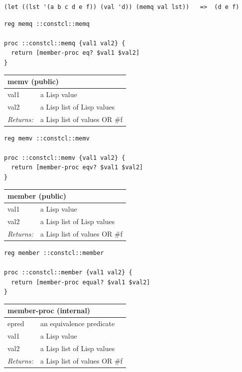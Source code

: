 \documentclass[twoside,9pt]{report}
\begin{document}
\noindent\makebox[\linewidth]{\rule{\linewidth}{0.4pt}}
\begin{lstlisting}
(let ((lst '(a b c d e f)) (val 'd)) (memq val lst))   =>  (d e f)
\end{lstlisting}
\noindent\makebox[\linewidth]{\rule{\linewidth}{0.4pt}}
\noindent\makebox[\linewidth]{\rule{\linewidth}{0.4pt}}
\begin{lstlisting}
reg memq ::constcl::memq
 
proc ::constcl::memq {val1 val2} {
  return [member-proc eq? $val1 $val2]
}
\end{lstlisting}
\noindent\makebox[\linewidth]{\rule{\linewidth}{0.4pt}}
\begin{tabular}{ |l l| }
\hline
\multicolumn{2}{|l|}{memv (public)} \\
\hline
val1 & a Lisp value \\
val2 & a Lisp list of Lisp values \\
\textit{Returns:} & a Lisp list of values OR \#f \\
\hline
\end{tabular}

\noindent\makebox[\linewidth]{\rule{\linewidth}{0.4pt}}
\begin{lstlisting}
reg memv ::constcl::memv
 
proc ::constcl::memv {val1 val2} {
  return [member-proc eqv? $val1 $val2]
}
\end{lstlisting}
\noindent\makebox[\linewidth]{\rule{\linewidth}{0.4pt}}
\begin{tabular}{ |l l| }
\hline
\multicolumn{2}{|l|}{member (public)} \\
\hline
val1 & a Lisp value \\
val2 & a Lisp list of Lisp values \\
\textit{Returns:} & a Lisp list of values OR \#f \\
\hline
\end{tabular}

\noindent\makebox[\linewidth]{\rule{\linewidth}{0.4pt}}
\begin{lstlisting}
reg member ::constcl::member
 
proc ::constcl::member {val1 val2} {
  return [member-proc equal? $val1 $val2]
}
\end{lstlisting}
\noindent\makebox[\linewidth]{\rule{\linewidth}{0.4pt}}
\begin{tabular}{ |l l| }
\hline
\multicolumn{2}{|l|}{member-proc (internal)} \\
\hline
epred & an equivalence predicate \\
val1 & a Lisp value \\
val2 & a Lisp list of Lisp values \\
\textit{Returns:} & a Lisp list of values OR \#f \\
\hline
\end{tabular}
\end{document}
